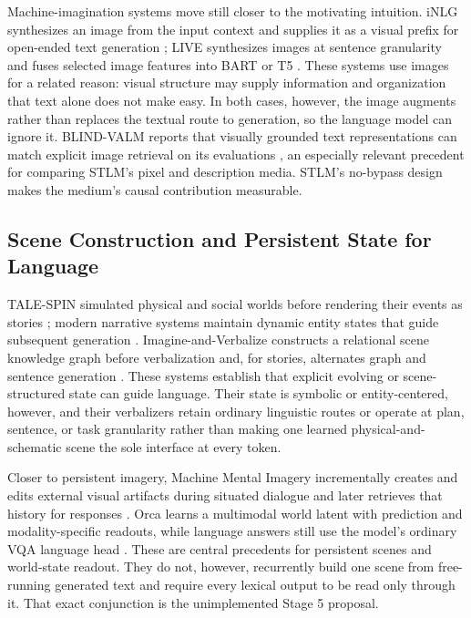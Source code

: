\documentclass[11pt,a4paper]{article}
\begin{document}
Machine-imagination systems move still closer to the motivating intuition. iNLG synthesizes an image from the input context and supplies it as a visual prefix for open-ended text generation \cite{inlg2023}; LIVE synthesizes images at sentence granularity and fuses selected image features into BART or T5 \cite{live2023}. These systems use images for a related reason: visual structure may supply information and organization that text alone does not make easy. In both cases, however, the image augments rather than replaces the textual route to generation, so the language model can ignore it. BLIND-VALM reports that visually grounded text representations can match explicit image retrieval on its evaluations \cite{blindvalm2025}, an especially relevant precedent for comparing STLM's pixel and description media. STLM's no-bypass design makes the medium's causal contribution measurable.

\subsection{Scene Construction and Persistent State for Language}

TALE-SPIN simulated physical and social worlds before rendering their events as stories \cite{talespin1977}; modern narrative systems maintain dynamic entity states that guide subsequent generation \cite{dynamicentities2023}. Imagine-and-Verbalize constructs a relational scene knowledge graph before verbalization and, for stories, alternates graph and sentence generation \cite{imagineverbalize2022}. These systems establish that explicit evolving or scene-structured state can guide language. Their state is symbolic or entity-centered, however, and their verbalizers retain ordinary linguistic routes or operate at plan, sentence, or task granularity rather than making one learned physical-and-schematic scene the sole interface at every token.

Closer to persistent imagery, Machine Mental Imagery incrementally creates and edits external visual artifacts during situated dialogue and later retrieves that history for responses \cite{visualscaffolding2026}. Orca learns a multimodal world latent with prediction and modality-specific readouts, while language answers still use the model's ordinary VQA language head \cite{orca2026}. These are central precedents for persistent scenes and world-state readout. They do not, however, recurrently build one scene from free-running generated text and require every lexical output to be read only through it. That exact conjunction is the unimplemented Stage 5 proposal.
\end{document}
